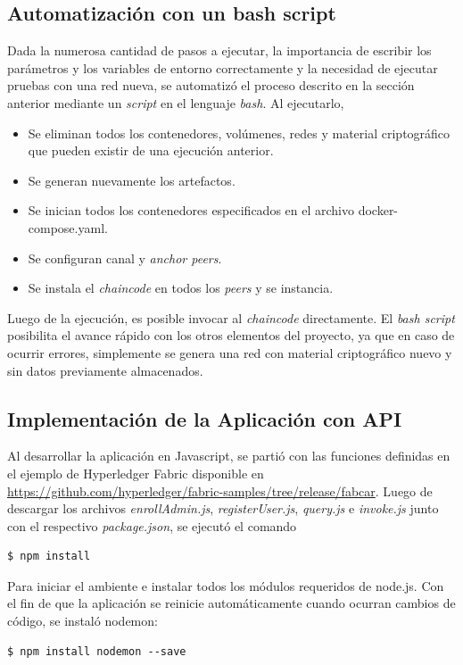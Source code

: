 \subsection{Automatización con un bash script}
Dada la numerosa cantidad de pasos a ejecutar, la importancia de escribir los parámetros y los variables de entorno correctamente y la necesidad de ejecutar pruebas con una red nueva, se automatizó el proceso descrito en la sección anterior mediante un \textit
{script} en el lenguaje \textit{bash}. Al ejecutarlo, 
\begin{itemize}
    \item Se eliminan todos los contenedores, volúmenes, redes y material criptográfico que pueden existir de una ejecución anterior.
    \item Se generan nuevamente los artefactos.
    \item Se inician todos los contenedores especificados en el archivo docker-compose.yaml.
    \item Se configuran canal y \textit{anchor peers}.
    \item Se instala el \textit{chaincode} en todos los \textit{peers} y se instancia.
\end{itemize}
Luego de la ejecución, es posible invocar al \textit{chaincode} directamente. El \textit{bash script} posibilita el avance rápido con los otros elementos del proyecto, ya que en caso de ocurrir errores, simplemente se genera una red con material criptográfico nuevo y sin datos previamente almacenados.

\subsection{Implementación de la Aplicación con API}
Al desarrollar la aplicación en Javascript, se partió con las funciones definidas en el ejemplo de Hyperledger Fabric disponible en \href{https://github.com/hyperledger/fabric-samples/tree/release/fabcar}{https://github.com/hyperledger/fabric-samples/tree/release/fabcar}. Luego de descargar los archivos \textit{enrollAdmin.js}, \textit{registerUser.js}, \textit{query.js} e \textit{invoke.js} junto con el respectivo \textit{package.json}, se ejecutó el comando
\begin{verbatim}
$ npm install
\end{verbatim}
Para iniciar el ambiente e instalar todos los módulos requeridos de node.js. Con el fin de que la aplicación se reinicie automáticamente cuando ocurran cambios de código, se instaló nodemon:
\begin{verbatim}
$ npm install nodemon --save
\end{verbatim}

